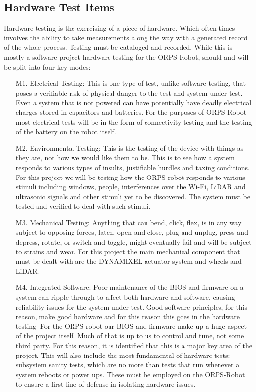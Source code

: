 \documentclass[english,12pt]{article}
\begin{document}
\subsection{Hardware Test Items}
Hardware testing is the exercising of a piece of hardware. Which often times involves the 
ability to take measurements along the way with a generated record of the whole process. Testing 
must be cataloged and recorded. While this is mostly a software project hardware testing for the 
ORPS-Robot, should and will be split into four key modes:\\
\begin{itemize}
\item[M1.] Electrical Testing: This is one type of test, unlike software testing, that 
poses a verifiable risk of physical danger to the test and system under test. Even a system that 
is not powered can have potentially have deadly electrical charges stored in capacitors and batteries. 
For the purposes of ORPS-Robot most electrical tests will be in the form of connectivity testing 
and the testing of the battery on the robot itself. 
\item[M2.] Environmental Testing: This is the testing of the device with things as they are, 
not how we would like them to be. This is to see how a system responds to various types of insults, 
justifiable hurdles and taxing conditions. For this project we will be testing how the ORPS-robot 
responds to various stimuli including windows, people, interferences over the Wi-Fi, LiDAR and 
ultrasonic signals and other stimuli yet to be discovered. The system must be tested and verified to deal 
with such stimuli.
\item[M3.] Mechanical Testing: Anything that can bend, click, flex, is in any way subject to opposing 
forces, latch, open and close, plug and unplug, press and depress, rotate, or switch and toggle, might 
eventually fail and will be subject to strains and wear. For this project the main mechanical component 
that must be dealt with are the DYNAMIXEL actuator system and wheels and LiDAR. 
\item[M4.] Integrated Software: Poor maintenance of the BIOS and firmware on a system can ripple through to 
affect both hardware and software, causing reliability issues for the system under test. Good software principles, 
for this reason, make good hardware and for this reason this goes in the hardware testing.  For the ORPS-robot 
our BIOS and firmware make up a huge aspect of the project itself. Much of that is up to us to control and tune, 
not some third party. For this reason, it is identified that this is a major key area of the project. This will 
also include the most fundamental of hardware tests: subsystem sanity tests, which are no more than tests that 
run whenever a system reboots or power ups. These must be employed on the ORPS-Robot to ensure a first line of 
defense in isolating hardware issues.
\end{itemize}
\end{document}
